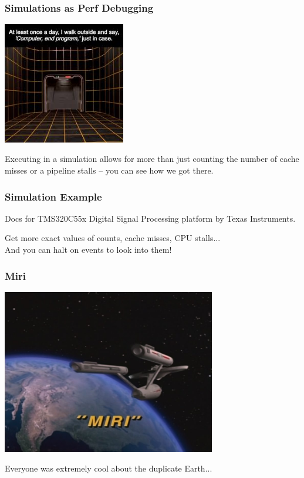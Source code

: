 \begin{frame}
\frametitle{Simulations as Perf Debugging}

\begin{center}
	\includegraphics[width=0.4\textwidth]{images/endprogram.jpg}
\end{center}

Executing in a simulation allows for more than just counting the number of cache misses or a pipeline stalls -- you can see how we got there.

\end{frame}

\begin{frame}
\frametitle{Simulation Example}

Docs for TMS320C55x Digital Signal Processing platform by Texas Instruments.

Get more exact values of counts, cache misses, CPU stalls...\\
\quad And you can halt on events to look into them!

\end{frame}

\begin{frame}
\frametitle{Miri}

\begin{center}
	\includegraphics[width=0.7\textwidth]{images/miri.jpg}
\end{center}

Everyone was extremely cool about the duplicate Earth...

\end{frame}

